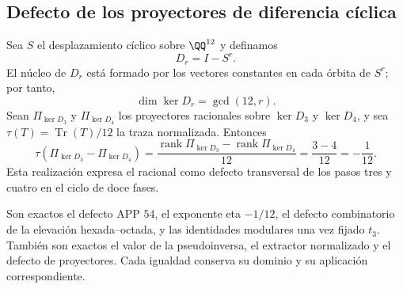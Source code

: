 \subsection{Defecto de los proyectores de diferencia cíclica}

Sea \(S\) el desplazamiento cíclico sobre \(\QQ^{12}\) y definamos
\[
 D_r=I-S^r.
\]
El núcleo de \(D_r\) está formado por los vectores constantes en cada órbita
de \(S^r\); por tanto,
\[
 \dim\ker D_r=\gcd(12,r).
\]
Sean \(\Pi_{\ker D_3}\) y \(\Pi_{\ker D_4}\) los proyectores racionales sobre
\(\ker D_3\) y \(\ker D_4\), y sea
\(\tau(T)=\operatorname{Tr}(T)/12\) la traza normalizada. Entonces
\[
 \boxed{
 \tau(\Pi_{\ker D_3}-\Pi_{\ker D_4})
 =\frac{\operatorname{rank}\Pi_{\ker D_3}
       -\operatorname{rank}\Pi_{\ker D_4}}{12}
 =\frac{3-4}{12}
 =-\frac1{12}.}
\]
Esta realización expresa el racional como defecto transversal de los pasos
tres y cuatro en el ciclo de doce fases.

\begin{remark}
Son exactos el defecto APP \(54\), el exponente eta \(-1/12\), el defecto
combinatorio de la elevación hexada--octada, y las
identidades modulares una vez fijado \(t_3\). También son exactos el valor
de la pseudoinversa, el extractor normalizado y el defecto de proyectores.
Cada igualdad conserva su dominio y su aplicación correspondiente.
\end{remark}
